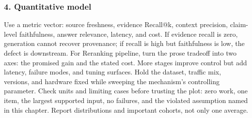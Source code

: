 \subsubsection*{4. Quantitative model}
Use a metric vector: source freshness, evidence Recall@k, context precision, claim-level faithfulness, answer relevance, latency, and cost. If evidence recall is zero, generation cannot recover provenance; if recall is high but faithfulness is low, the defect is downstream.
For Reranking pipeline, turn the prose tradeoff into two axes: the promised gain and the stated cost. More stages improve control but add latency, failure modes, and tuning surfaces. Hold the dataset, traffic mix, versions, and hardware fixed while sweeping the mechanism's controlling parameter.
Check units and limiting cases before trusting the plot: zero work, one item, the largest supported input, no failures, and the violated assumption named in this chapter. Report distributions and important cohorts, not only one average.
